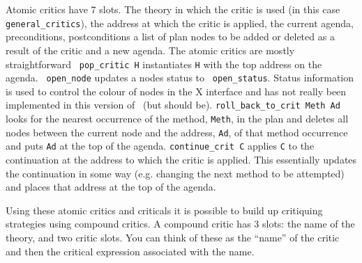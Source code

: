 Atomic critics have 7 slots.  The theory in which
the critic is used (in this case {\tt
  general\_critics}), the address at which the
critic is applied, the current agenda, preconditions, postconditions a
list of plan nodes to be added or deleted as a result of the critic
and a new agenda.  The atomic critics are mostly straightforward {\tt
  pop\_critic H} instantiates {\tt H} with the top
address on the agenda.  {\tt
  open\_node} updates a nodes status to {\tt
  open\_status}.  Status information is used to
control the colour of nodes in the X\lclam{} interface
and has not really been implemented in this version of \lclam\ (but
should be).  {\tt roll\_back\_to\_crit Meth
  Ad} looks for the nearest occurrence of
the method, {\tt Meth}, in the plan and deletes all nodes between the
current node and the address, {\tt Ad}, of that method occurrence and
puts {\tt Ad} at the top of the agenda.  {\tt continue\_crit
  C} applies {\tt C} to the
continuation at the address to which the critic is
applied.  This essentially updates the continuation in some way (e.g.
changing the next method to be attempted) and places that address at
the top of the agenda.

Using these atomic critics and
criticals it is possible to build up critiquing
strategies using compound critics.  A compound
critic has 3 slots: the name of the theory, and two critic slots.  You 
can think of these as the ``name'' of the critic and then the critical 
expression associated with the name.  

